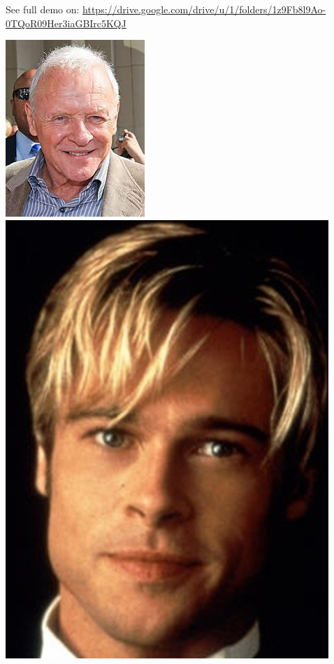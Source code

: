 \documentclass{article}
\begin{document}
\begin{center}
See full demo on: \url{https://drive.google.com/drive/u/1/folders/1z9Fb8l9Ao-0TQoR09Her3iaGBIrc5KQJ}
\begin{multicols}{4}
\includegraphics[scale=0.38]{images/Anhony_Hopkins.jpg}
\includegraphics[scale=0.25]{images/Brad_Pitt.jpg}

\end{multicols}
\end{center}
\end{document}
